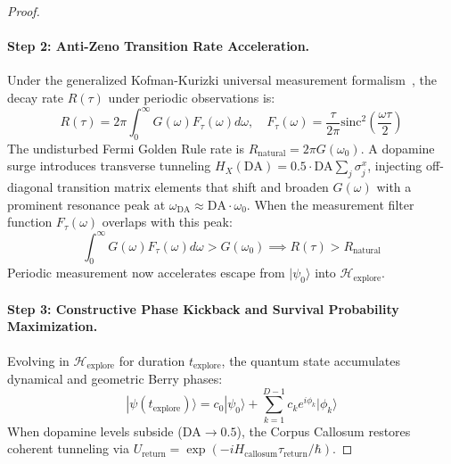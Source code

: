 \documentclass[10pt,twocolumn,3p]{article}
\begin{document}
\begin{proof}
\paragraph{Step 2: Anti-Zeno Transition Rate Acceleration.}
Under the generalized Kofman-Kurizki universal measurement formalism~\cite{kofman2000,facchi2008}, the decay rate $R(\tau)$ under periodic observations is:
\begin{equation}
    R(\tau) = 2\pi \int_0^\infty G(\omega) F_\tau(\omega) d\omega, \quad F_\tau(\omega) = \frac{\tau}{2\pi} \text{sinc}^2\left(\frac{\omega \tau}{2}\right)
\end{equation}
The undisturbed Fermi Golden Rule rate is $R_{\text{natural}} = 2\pi G(\omega_0)$. A dopamine surge introduces transverse tunneling $H_X(\text{DA}) = 0.5 \cdot \text{DA} \sum_j \sigma_j^x$, injecting off-diagonal transition matrix elements that shift and broaden $G(\omega)$ with a prominent resonance peak at $\omega_{\text{DA}} \approx \text{DA} \cdot \omega_0$. When the measurement filter function $F_\tau(\omega)$ overlaps with this peak:
\begin{equation}
    \int_0^\infty G(\omega) F_\tau(\omega) d\omega > G(\omega_0) \implies \boxed{R(\tau) > R_{\text{natural}}}
\end{equation}
Periodic measurement now accelerates escape from $|\psi_0\rangle$ into $\mathcal{H}_{\text{explore}}$.

\paragraph{Step 3: Constructive Phase Kickback and Survival Probability Maximization.}
Evolving in $\mathcal{H}_{\text{explore}}$ for duration $t_{\text{explore}}$, the quantum state accumulates dynamical and geometric Berry phases:
\begin{equation}
    |\psi(t_{\text{explore}})\rangle = c_0 |\psi_0\rangle + \sum_{k=1}^{D-1} c_k e^{i \phi_k} |\phi_k\rangle
\end{equation}
When dopamine levels subside ($\text{DA} \to 0.5$), the Corpus Callosum restores coherent tunneling via $U_{\text{return}} = \exp(-i H_{\text{callosum}} \tau_{\text{return}}/\hbar)$.


\end{proof}
\end{document}

